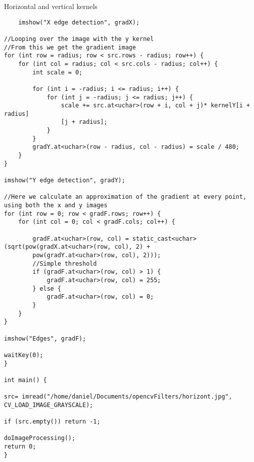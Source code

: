 \begin{listing}[H]
	\caption{Horizontal and vertical kernels}
	\label{listing:code2}
	\begin{verbatim}
    imshow("X edge detection", gradX);

//Looping over the image with the y kernel
//From this we get the gradient image
for (int row = radius; row < src.rows - radius; row++) {
	for (int col = radius; col < src.cols - radius; col++) {
		int scale = 0;
		
		for (int i = -radius; i <= radius; i++) {
			for (int j = -radius; j <= radius; j++) {
				scale += src.at<uchar>(row + i, col + j)* kernelY[i + radius]
				[j + radius];
			}
		}
		gradY.at<uchar>(row - radius, col - radius) = scale / 480;
	}
}

imshow("Y edge detection", gradY);

//Here we calculate an approximation of the gradient at every point, using both the x and y images
for (int row = 0; row < gradF.rows; row++) {
	for (int col = 0; col < gradF.cols; col++) {
		
		gradF.at<uchar>(row, col) = static_cast<uchar>(sqrt(pow(gradX.at<uchar>(row, col), 2) + 
		pow(gradY.at<uchar>(row, col), 2)));
		//Simple threshold
		if (gradF.at<uchar>(row, col) > 1) {
			gradF.at<uchar>(row, col) = 255;
		} else {
			gradF.at<uchar>(row, col) = 0;
		}
	}
}

imshow("Edges", gradF);

waitKey(0);
}

int main() {

src= imread("/home/daniel/Documents/opencvFilters/horizont.jpg", CV_LOAD_IMAGE_GRAYSCALE);

if (src.empty()) return -1;

doImageProcessing();
return 0;
}
\end{verbatim}
\end{listing}